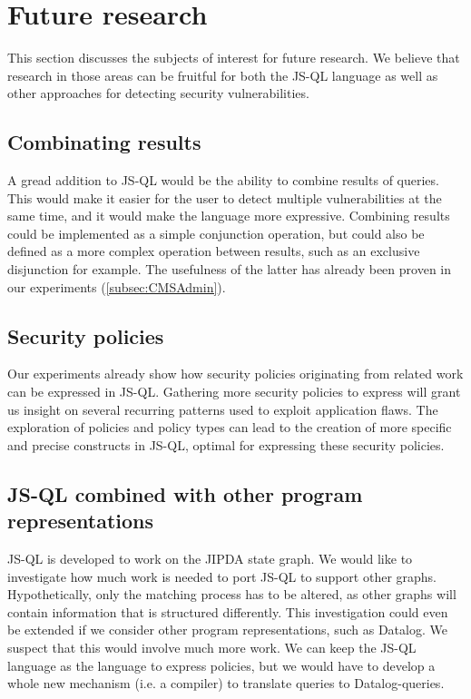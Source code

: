 \section{Future research}

This section discusses the subjects of interest for future research. We believe that research in those areas can be fruitful for both the JS-QL language as well as other approaches for detecting security vulnerabilities.

\subsection*{Combinating results}

A gread addition to JS-QL would be the ability to combine results of queries. This would make it easier for the user to detect multiple vulnerabilities at the same time, and it would make the language more expressive. Combining results could be implemented as a simple conjunction operation, but could also be defined as a more complex operation between results, such as an exclusive disjunction for example. The usefulness of the latter has already been proven in our experiments (\ref{subsec:CMSAdmin}).

\subsection*{Security policies}
Our experiments already show how security policies originating from related work can be expressed in JS-QL. Gathering more security policies to express will grant us insight on several recurring patterns used to exploit application flaws. The exploration of policies and policy types can lead to the creation of more specific and precise constructs in JS-QL, optimal for expressing these security policies.

\subsection*{JS-QL combined with other program representations}
JS-QL is developed to work on the JIPDA state graph. We would like to investigate how much work is needed to port JS-QL to support other graphs. Hypothetically, only the matching process has to be altered, as other graphs will contain information that is structured differently. This investigation could even be extended if we consider other program representations, such as Datalog. We suspect that this would involve much more work. We can keep the JS-QL language as the language to express policies, but we would have to develop a whole new mechanism (i.e. a compiler) to translate queries to Datalog-queries.


